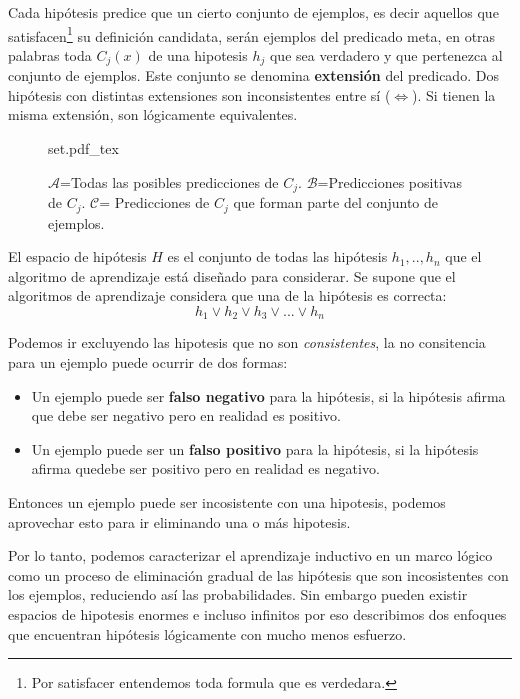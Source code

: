 \documentclass[12 pt, a4paper]{article}
\begin{document}
		Cada hipótesis predice que un cierto conjunto de ejemplos, es decir aquellos que satisfacen\footnote{Por satisfacer entendemos toda formula que es verdedara.} su definición candidata, serán ejemplos del predicado meta, en otras palabras toda \(C_{j}(x)\) de una hipotesis \(h_{j}\) que sea verdadero y que pertenezca al conjunto de ejemplos. Este conjunto se denomina \textbf{extensión} del predicado. Dos hipótesis con distintas extensiones son inconsistentes entre sí (\(\iff\)). Si tienen la misma extensión, son lógicamente equivalentes.
		\begin{figure}[hbt!]		
			\centering
			{set.pdf_tex}
			\caption{$\mathcal{A}$=Todas las posibles predicciones de $C_{j}$. $\mathcal{B}$=Predicciones positivas de $C_{j}$. $\mathcal{C}$= Predicciones de $C_{j}$ que forman parte del conjunto de ejemplos.}
			\label{fig: set_output}
		\end{figure}
		
		El espacio de hipótesis \(H\) es el conjunto de todas las hipótesis \(h_{1},..,h_{n}\) que el algoritmo de aprendizaje está diseñado para considerar. Se supone que el algoritmos de aprendizaje considera que una de la hipótesis es correcta:
		$$h_{1} \lor h_{2} \lor h_{3}\lor ... \lor h_{n}$$
		
		Podemos ir excluyendo las hipotesis que no son \emph{consistentes}, la no consitencia para un ejemplo puede ocurrir de dos formas:
		
		\begin{itemize}
			\item Un ejemplo puede ser \textbf{falso negativo} para la hipótesis, si la hipótesis afirma que debe ser negativo pero en realidad es positivo.\\
			\item Un ejemplo puede ser un \textbf{falso positivo} para la hipótesis, si la hipótesis afirma quedebe ser positivo pero en realidad es negativo.
		\end{itemize}
		
		Entonces un ejemplo puede ser incosistente con una hipotesis, podemos aprovechar esto para ir eliminando una o más hipotesis.
		 
		 Por lo tanto, podemos caracterizar el aprendizaje inductivo en un marco lógico como un proceso de eliminación gradual de las hipótesis que son incosistentes con los ejemplos, reduciendo así las probabilidades. Sin embargo pueden existir espacios de hipotesis enormes e incluso infinitos por eso describimos dos enfoques que encuentran hipótesis lógicamente con mucho menos esfuerzo.
		 
\end{document}
